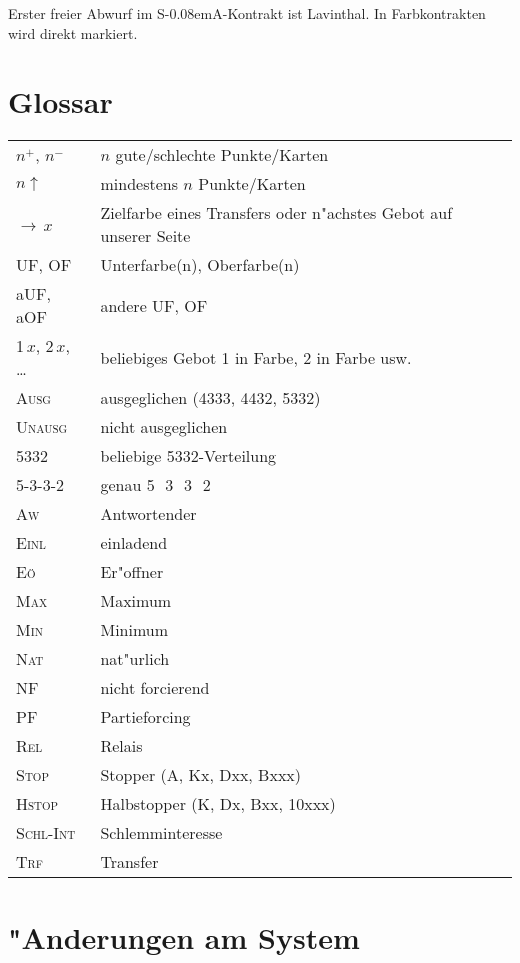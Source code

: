 \documentclass[11pt,german,twocolumn]{scrartcl}
\def\pik{\nobreak\,\Sp}
\def\coe{\nobreak\,\He}
\def\kar{\nobreak\,\Di}
\def\tre{\nobreak\,\Cl}
\def\good{$^+$}
\def\bad{$^-$}
\def\ra{$\rightarrow$}
\def\pl{$\uparrow$}
\def\ufa{\nobreak\textsf{UF}}
\def\aufa{\nobreak\textsf{aUF}}
\def\ofa{\nobreak\textsf{OF}}
\def\aofa{\nobreak\textsf{aOF}}
\def\sa{\nobreak\textsf{S\kern-0.08emA}}
\def\bal{\textsc{Ausg}}
\def\unbal{\textsc{Unausg}}
\def\nat{\textsc{Nat}}
\def\pf{\textsc{PF}}
\def\maxi{\textsc{Max}}
\def\mini{\textsc{Min}}
\def\inv{\textsc{Einl}}
\def\nf{\textsc{NF}}
\def\rel{\textsc{Rel}}
\def\stp{\textsc{Stop}}
\def\hstp{\textsc{Hstop}}
\def\aw{\textsc{Aw}}
\def\eo{\textsc{E\"o}}
\def\xfer{\textsc{Trf}}
\def\slamint{\textsc{Schl-Int}}
\begin{document}
Erster freier Abwurf im \sa-Kontrakt ist Lavinthal. In Farbkontrakten wird
direkt markiert.
\raggedbottom
\begin{appendix}

\section{Glossar}

\begin{flushleft}
\begin{tabularx}{\columnwidth}{lY}%
$n$\good, $n$\bad & $n$ gute/schlechte Punkte/Karten\\
$n$\pl & mindestens $n$ Punkte/Karten\\
\ra\,$x$ & Zielfarbe eines Transfers oder n"achstes Gebot auf unserer Seite\\
\ufa, \ofa & Unterfarbe(n), Oberfarbe(n)\\
\aufa, \aofa & andere \ufa, \ofa\\
1\,$x$, 2\,$x$, \ldots & beliebiges Gebot 1 in Farbe, 2 in Farbe usw.\\
\bal & ausgeglichen (4333, 4432, 5332)\\
\unbal & nicht ausgeglichen \\
5332 & beliebige 5332-Verteilung\\
5-3-3-2 & genau 5\pik\ 3\coe\ 3\kar\ 2\tre\\
\aw & Antwortender \\
\inv & einladend \\
\eo & Er"offner \\
\maxi & Maximum \\
\mini & Minimum \\
\nat & nat"urlich \\
\nf & nicht forcierend \\
\pf & Partieforcing \\
\rel & Relais \\
\stp & Stopper (A, Kx, Dxx, Bxxx) \\
\hstp & Halbstopper (K, Dx, Bxx, 10xxx) \\
\slamint & Schlemminteresse \\
\xfer & Transfer \\
\end{tabularx}%
\end{flushleft}

\section{"Anderungen am System}


\end{appendix}
\end{document}

